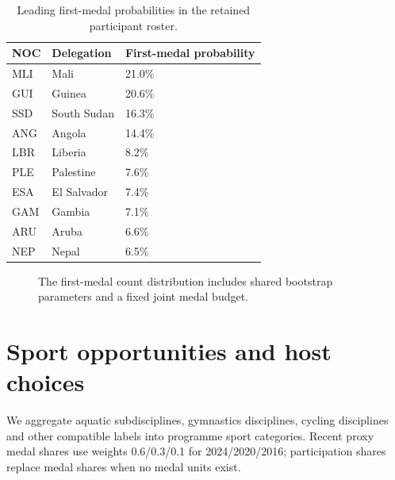 \documentclass[11pt,a4paper]{article}
\begin{document}
\begin{table}[htbp]
\centering
\caption{Leading first-medal probabilities in the retained participant roster.}
\label{tab:4}
\small
\begin{tabular}{@{}L{4.122cm} R{6.107cm} R{5.038cm}@{}}
\toprule
NOC & Delegation & First-medal probability\\
\midrule
MLI & Mali & 21.0\%\\
GUI & Guinea & 20.6\%\\
SSD & South Sudan & 16.3\%\\
ANG & Angola & 14.4\%\\
LBR & Liberia & 8.2\%\\
PLE & Palestine & 7.6\%\\
ESA & El Salvador & 7.4\%\\
GAM & Gambia & 7.1\%\\
ARU & Aruba & 6.6\%\\
NEP & Nepal & 6.5\%\\
\bottomrule
\end{tabular}
\end{table}
\begin{figure}[htbp]
\centering
\begin{center}\end{center}

\caption{The first-medal count distribution includes shared bootstrap parameters and a fixed joint medal budget.}
\label{fig:3}
\end{figure}
\section{Sport opportunities and host choices}
We aggregate aquatic subdisciplines, gymnastics disciplines, cycling disciplines and other compatible labels into programme sport categories. Recent proxy medal shares use weights 0.6/0.3/0.1 for 2024/2020/2016; participation shares replace medal shares when no medal units exist.
\end{document}
